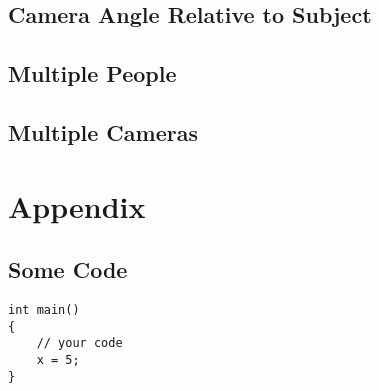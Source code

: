 \documentclass[10pt]{article}
\begin{document}
\subsection{Camera Angle Relative to Subject}
\subsection{Multiple People}
\subsection{Multiple Cameras}
\clearpage

\section*{Appendix}
\subsection*{Some Code}
\begin{lstlisting}
int main()
{
	// your code
	x = 5;
}

\end{lstlisting}
\end{document}
